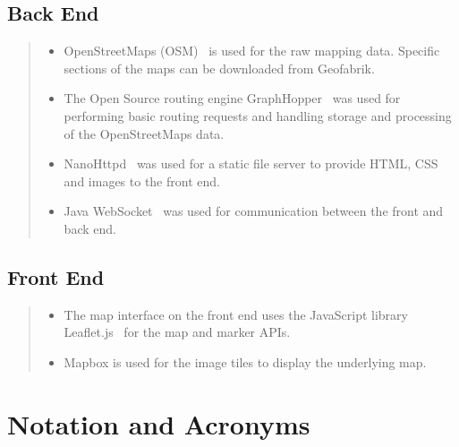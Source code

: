 \documentclass[ %
                    author={Alexander Hill},
                supervisor={Dr. Benjamin Sach},
                    degree={MEng},
                     title={MARMOSET},
                  subtitle={Multi-Agent Route Management using Online Simulation for Efficient Transportation},
                      type={research},
                      year={2016} ]{dissertation}
\begin{document}
\section*{Back End}
\begin{quote}
\noindent
\begin{itemize}
    \item OpenStreetMaps (OSM)~\cite{osm} is used for the raw mapping data. Specific sections of
        the maps can be downloaded from Geofabrik.
    \item The Open Source routing engine GraphHopper~\cite{graphhopper} was
        used for performing basic routing requests and handling storage and
        processing of the OpenStreetMaps data.
    \item NanoHttpd~\cite{nanohttpd} was used for a static file server to
        provide HTML, CSS and images to the front end.
    \item Java WebSocket~\cite{javawebsocket} was used for communication
        between the front and back end.
\end{itemize}
\end{quote}

\section*{Front End}
\begin{quote}
\noindent
\begin{itemize}
    \item The map interface on the front end uses the JavaScript library
    Leaflet.js~\cite{leaflet} for the map and marker APIs.
    \item Mapbox is used for the image tiles to display the underlying map.
\end{itemize}
\end{quote}



\chapter*{Notation and Acronyms}


\end{document}
